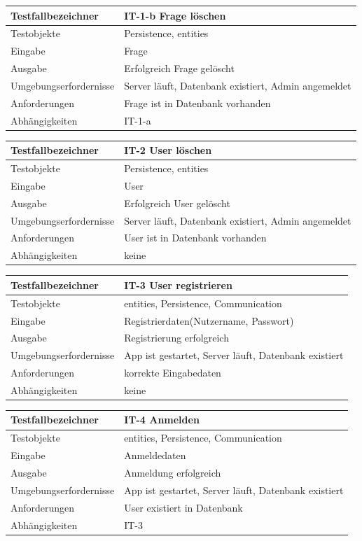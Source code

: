 \documentclass[fontsize=12pt,paper=a4,twoside]{scrartcl}
\begin{document}
\begin{tabular}{|l|p{12cm}|}
\hline
	Testfallbezeichner & IT-1-b Frage löschen\\
\hline
	Testobjekte & Persistence, entities\\
\hline
	Eingabe & Frage\\
\hline
	Ausgabe & Erfolgreich Frage gelöscht\\
\hline
	Umgebungserfordernisse & Server läuft, Datenbank existiert, Admin angemeldet\\
\hline
	Anforderungen & Frage ist in Datenbank vorhanden\\
\hline
	Abhängigkeiten & IT-1-a \\
\hline
\end{tabular}


\begin{tabular}{|l|p{12cm}|}
\hline
	Testfallbezeichner & IT-2 User löschen\\
\hline
	Testobjekte & Persistence, entities\\
\hline
	Eingabe & User\\
\hline
	Ausgabe & Erfolgreich User gelöscht\\
\hline
	Umgebungserfordernisse & Server läuft, Datenbank existiert, Admin angemeldet\\
\hline
	Anforderungen & User ist in Datenbank vorhanden\\
\hline
	Abhängigkeiten & keine \\
\hline
\end{tabular}

\begin{tabular}{|l|p{12cm}|}
\hline
	Testfallbezeichner & IT-3 User registrieren\\
\hline
	Testobjekte & entities, Persistence, Communication\\
\hline
	Eingabe &  Registrierdaten(Nutzername, Passwort)\\
\hline
	Ausgabe & Registrierung erfolgreich\\
\hline
	Umgebungserfordernisse & App ist gestartet, Server läuft, Datenbank existiert\\
\hline
	Anforderungen & korrekte Eingabedaten\\
\hline
	Abhängigkeiten & keine \\
\hline
\end{tabular}

\begin{tabular}{|l|p{12cm}|}
\hline
	Testfallbezeichner & IT-4 Anmelden\\
\hline
	Testobjekte & entities, Persistence, Communication\\
\hline
	Eingabe &  Anmeldedaten\\
\hline
	Ausgabe & Anmeldung erfolgreich\\
\hline
	Umgebungserfordernisse & App ist gestartet, Server läuft, Datenbank existiert\\
\hline
	Anforderungen & User existiert in Datenbank\\
\hline
	Abhängigkeiten & IT-3 \\
\hline
\end{tabular}
\end{document}
